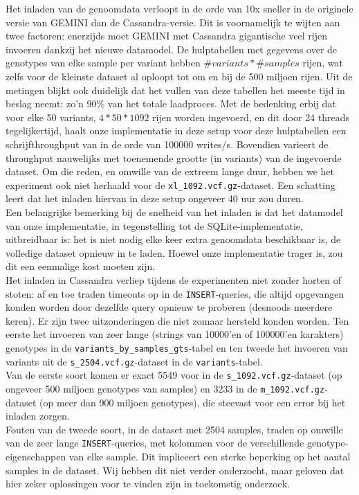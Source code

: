 Het inladen van de genoomdata verloopt in de orde van 10x sneller in de originele versie van GEMINI dan de Cassandra-versie. Dit is voornamelijk te wijten aan twee factoren: enerzijds moet GEMINI met Cassandra gigantische veel rijen invoeren dankzij het nieuwe datamodel. De hulptabellen met gegevens over de genotypes van elke sample per variant hebben $\#variants * \#samples$ rijen, wat zelfs voor de kleinste dataset al oploopt tot om en bij de 500 miljoen rijen. Uit de metingen blijkt ook duidelijk dat het vullen van deze tabellen het meeste tijd in beslag neemt: zo'n 90\% van het totale laadproces. Met de bedenking erbij dat voor elke 50 variants, $4 * 50 * 1092$ rijen worden ingevoerd, en dit door 24 threads tegelijkertijd, haalt onze implementatie in deze setup voor deze hulptabellen een schrijfthroughput van in de orde van 100000 writes/s. Bovendien varieert de throughput nauwelijks met toenemende grootte (in variants) van de ingevoerde dataset. Om die reden, en omwille van de extreem lange duur, hebben we het experiment ook niet herhaald voor de \texttt{xl\_1092.vcf.gz}-dataset. Een schatting leert dat het inladen hiervan in deze setup ongeveer 40 uur zou duren.\\
Een belangrijke bemerking bij de snelheid van het inladen is dat het datamodel van onze implementatie, in tegenstelling tot de SQLite-implementatie, uitbreidbaar is: het is niet nodig elke keer extra genoomdata beschikbaar is, de volledige dataset opnieuw in te laden. Hoewel onze implementatie trager is, zou dit een eenmalige kost moeten zijn.\\

Het inladen in Cassandra verliep tijdens de experimenten niet zonder horten of stoten: af en toe traden timeouts op in de \texttt{INSERT}-queries, die altijd opgevangen konden worden door dezelfde query opnieuw te proberen (desnoods meerdere keren). Er zijn twee uitzonderingen die niet zomaar hersteld konden worden. Ten eerste het invoeren van zeer lange (strings van 10000'en of 100000'en karakters) genotypes in de \texttt{variants\_by\_samples\_gts}-tabel en ten tweede het invoeren van variants uit de \texttt{s\_2504.vcf.gz}-dataset in de \texttt{variants}-tabel.\\
Van de eerste soort komen er exact 5549 voor in de \texttt{s\_1092.vcf.gz}-dataset (op ongeveer 500 miljoen genotypes van samples) en 3233 in de \texttt{m\_1092.vcf.gz}-dataset (op meer dan 900 miljoen genotypes), die steevast voor een error bij het inladen zorgen.\\
Fouten van de tweede soort, in de dataset met 2504 samples, traden op omwille van de zeer lange \texttt{INSERT}-queries, met kolommen voor de verschillende genotype-eigenschappen van elke sample. Dit impliceert een sterke beperking op het aantal samples in de dataset. Wij hebben dit niet verder onderzocht, maar geloven dat hier zeker oplossingen voor te vinden zijn in toekomstig onderzoek.

